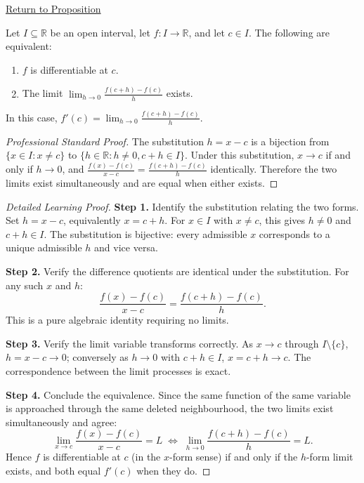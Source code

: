 \newpage
{}
\label{prf:derivative-h-form-equivalence}

\begin{remark*}[Return]
\hyperref[prop:derivative-h-form-equivalence]{Return to Proposition}
\end{remark*}

\begin{proposition*}
Let $I \subseteq \mathbb{R}$ be an open interval, let $f : I \to \mathbb{R}$, and let $c \in I$. The following are equivalent:
\begin{enumerate}
\item $f$ is differentiable at $c$.
\item The limit $\displaystyle\lim_{h \to 0} \frac{f(c + h) - f(c)}{h}$ exists.
\end{enumerate}
In this case, $\displaystyle f'(c) = \lim_{h \to 0} \frac{f(c + h) - f(c)}{h}$.
\end{proposition*}

\begin{proof}[Professional Standard Proof]
\LRAProofBodyStart
The substitution $h = x - c$ is a bijection from $\{x \in I : x \neq c\}$ to $\{h \in \mathbb{R} : h \neq 0, c+h \in I\}$. Under this substitution, $x \to c$ if and only if $h \to 0$, and $\frac{f(x)-f(c)}{x-c} = \frac{f(c+h)-f(c)}{h}$ identically. Therefore the two limits exist simultaneously and are equal when either exists.
\end{proof}

\begin{proof}[Detailed Learning Proof]
\LRAProofBodyStart

\textbf{Step 1.} Identify the substitution relating the two forms. Set $h = x - c$, equivalently $x = c + h$. For $x \in I$ with $x \neq c$, this gives $h \neq 0$ and $c + h \in I$. The substitution is bijective: every admissible $x$ corresponds to a unique admissible $h$ and vice versa.

\textbf{Step 2.} Verify the difference quotients are identical under the substitution. For any such $x$ and $h$:
\[
\frac{f(x) - f(c)}{x - c} = \frac{f(c + h) - f(c)}{h}.
\]
This is a pure algebraic identity requiring no limits.

\textbf{Step 3.} Verify the limit variable transforms correctly. As $x \to c$ through $I \setminus \{c\}$, $h = x - c \to 0$; conversely as $h \to 0$ with $c + h \in I$, $x = c + h \to c$. The correspondence between the limit processes is exact.

\textbf{Step 4.} Conclude the equivalence. Since the same function of the same variable is approached through the same deleted neighbourhood, the two limits exist simultaneously and agree:
\[
\lim_{x \to c} \frac{f(x)-f(c)}{x-c} = L
\;\iff\;
\lim_{h \to 0} \frac{f(c+h)-f(c)}{h} = L.
\]
Hence $f$ is differentiable at $c$ (in the $x$-form sense) if and only if the $h$-form limit exists, and both equal $f'(c)$ when they do.
\end{proof}

